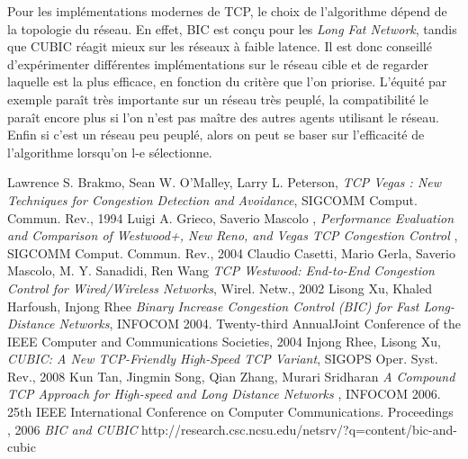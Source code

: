 \documentclass[	DIV=calc,%
							paper=a4,%
							fontsize=11pt,%
							twocolumn]{scrartcl}	 					%
\begin{document}
Pour les implémentations modernes de TCP, le choix de l'algorithme dépend de la topologie du réseau. En effet, BIC est conçu pour les \textit{Long Fat Network}, tandis que CUBIC réagit mieux sur les réseaux à faible latence. Il est donc conseillé d'expérimenter différentes implémentations sur le réseau cible et de regarder laquelle est la plus efficace, en fonction du critère que l'on priorise. L'équité par exemple paraît très importante sur un réseau très peuplé, la compatibilité le paraît encore plus si l'on n'est pas maître des autres agents utilisant le réseau. Enfin si c'est un réseau peu peuplé, alors on peut se baser sur l'efficacité de l'algorithme lorsqu'on l-e sélectionne.
\begin{thebibliography}{9}

\tiny{
	Lawrence S. Brakmo, Sean W. O’Malley, Larry L. Peterson,
	\emph{TCP Vegas : New Techniques for Congestion Detection and Avoidance},
	SIGCOMM Comput. Commun. Rev.,
	1994
	Luigi A. Grieco, Saverio Mascolo ,
	\emph{Performance Evaluation and Comparison of Westwood+, New Reno, and Vegas TCP Congestion Control },
	SIGCOMM Comput. Commun. Rev.,
	2004
	Claudio Casetti, Mario Gerla, Saverio Mascolo, M. Y. Sanadidi, Ren Wang
	\emph{TCP Westwood: End-to-End Congestion Control for Wired/Wireless Networks},
	Wirel. Netw.,
	2002
	Lisong Xu, Khaled Harfoush, Injong Rhee
	\emph{ Binary Increase Congestion Control (BIC) for Fast Long-Distance Networks},
	INFOCOM 2004. Twenty-third AnnualJoint Conference of the IEEE Computer and Communications Societies,
	2004
	Injong Rhee, Lisong Xu,
	\emph{CUBIC: A New TCP-Friendly High-Speed TCP Variant},
	SIGOPS Oper. Syst. Rev.,
	2008
	Kun Tan, Jingmin Song, Qian Zhang, Murari Sridharan
	\emph{A Compound TCP Approach for High-speed and Long Distance Networks },
	INFOCOM 2006. 25th IEEE International Conference on Computer Communications. Proceedings		,
	2006
	\emph{BIC and CUBIC}
	http://research.csc.ncsu.edu/netsrv/?q=content/bic-and-cubic}

\end{thebibliography}
\end{document}
